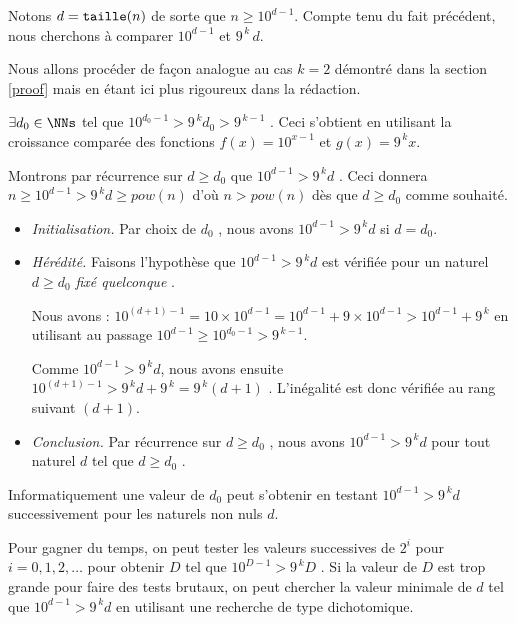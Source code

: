 \begin{proof*}\label{magicmajo-proof}
	Notons $d = \operatorname{\text{\normalfont\texttt{taille}}}(n)$ de sorte que $n \geqslant 10^{d-1}$.
	Compte tenu du fait précédent, nous cherchons à comparer $10^{d-1}$ et $9^{\,k} \, d$.
	
	
	\medskip
	
	Nous allons procéder de façon analogue au cas $k = 2$ démontré dans la section \ref{proof} mais en étant ici plus rigoureux dans la rédaction.
	
	
	\medskip
	
	$\exists d_0 \in \NNs$ tel que $10^{d_0 - 1} > 9^{\,k} d_0 > 9^{\,k  - 1}$ . Ceci s'obtient en utilisant la croissance comparée des fonctions $f(x) = 10^{x - 1}$ et $g(x) = 9^{\,k} x$.


	\medskip
	
	Montrons par récurrence sur $d \geqslant d_0$ que $10^{d - 1} > 9^{\,k} d$ .
	Ceci donnera $n \geqslant 10^{d - 1} > 9^{\,k} d \geqslant pow(n)$ d'où $n > pow(n)$ dès que $d \geqslant d_0$ comme souhaité.

	\begin{itemize}[label=\small\textbullet]
		\item \emph{Initialisation.}
		Par choix de $d_0$ , nous avons $10^{d-1} > 9^{\,k} d$ si $d = d_0$.

		\item \emph{Hérédité.}
		Faisons l'hypothèse que $10^{d-1} > 9^{\,k} d$ est vérifiée pour un naturel $d \geqslant d_0$ \emph{\og fixé quelconque \fg}.

		\smallskip
		
		\noindent
		Nous avons : $10^{(d+1)-1} = 10\times10^{d-1} = 10^{d-1} + 9\times10^{d-1} > 10^{d-1} + 9^{\,k}$
		en utilisant au passage $10^{d-1} \geqslant 10^{d_0-1} > 9^{\,k  - 1}$.

		\smallskip
		
		\noindent
		Comme $10^{d-1} > 9^{\,k} d$, nous avons ensuite $10^{(d+1)-1} > 9^{\,k} d + 9^{\,k} = 9^{\,k} (d+ 1)$ .
		L'inégalité est donc vérifiée au rang suivant $(d+1)$. 

		\item \emph{Conclusion.}
		Par récurrence sur $d \geqslant d_0$ , nous avons $10^{d - 1} > 9^{\,k} d$ pour tout naturel $d$ tel que $d \geqslant d_0$ .
	\end{itemize}
\end{proof*}
	

\medskip

\begin{remark}
	Informatiquement une valeur de $d_0$ peut s'obtenir en testant $10^{d - 1} > 9^{\,k} d$ successivement pour les naturels non nuls $d$.
	
	
	\medskip
	
	Pour gagner du temps, on peut tester les valeurs successives de $2^i$ pour $i = 0, 1, 2, \dots$ pour obtenir $D$ tel que $10^{D - 1} > 9^{\,k} D$ . Si la valeur de $D$ est trop grande pour faire des tests brutaux, on peut chercher la valeur minimale de $d$ tel que $10^{d - 1} > 9^{\,k} d$ en utilisant une recherche de type dichotomique. 
\end{remark}


